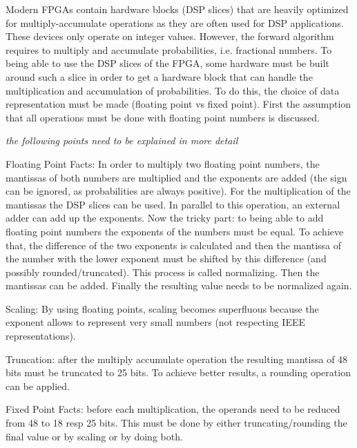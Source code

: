 \documentclass[mscthesis]{usiinfthesis}
\begin{document}
Modern FPGAs contain hardware blocks (DSP slices) that are heavily optimized
for multiply-accumulate operations as they are often used for DSP applications.
These devices only operate on integer values. However, the forward algorithm
requires to multiply and accumulate probabilities, i.e. fractional numbers. To
being able to use the DSP slices of the FPGA, some hardware must be built
around such a slice in order to get a hardware block that can handle the
multiplication and accumulation of probabilities. To do this, the choice of
data representation must be made (floating point vs fixed point). First the
assumption that all operations must be done with floating point numbers is
discussed.

\emph{\color{red}the following points need to be explained in more detail}

Floating Point Facts:
In order to multiply two floating point numbers, the mantissas of
both numbers are multiplied and the exponents are added (the sign can be
ignored, as probabilities are always positive). For the multiplication of the
mantissas the DSP slices can be used. In parallel to this operation, an
external adder can add up the exponents. Now the tricky part: to being able to
add floating point numbers the exponents of the numbers must be equal. To
achieve that, the difference of the two exponents is calculated and then the
mantissa of the number with the lower exponent must be shifted by this
difference (and possibly rounded/truncated). This process is called
normalizing. Then the mantissas can be added. Finally the resulting value
needs to be normalized again.

Scaling: By using floating points, scaling becomes superfluous because the
exponent allows to represent very small numbers (not respecting IEEE
representations).

Truncation: after the multiply accumulate operation the resulting mantissa of
48 bits must be truncated to 25 bits. To achieve better results, a rounding
operation can be applied.

Fixed Point Facts:
before each multiplication, the operands need to be reduced from 48 to 18 resp
25 bits. This must be done by either truncating/rounding the final value or by
scaling or by doing both.
\end{document}
